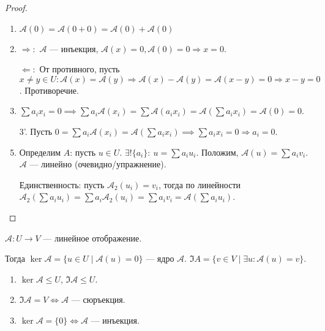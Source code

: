 \begin{proof}
     \begin{enumerate}
         \item $\mathcal{A}(0) = \mathcal{A}(0+0) = \mathcal{A}(0) + \mathcal{A}(0)$ 
         \item $\Rightarrow\!:$  $\mathcal{A}$ --- инъекция,  $\mathcal{A}(x) = 0, \mathcal{A}(0)=0 \Rightarrow x = 0$. 

        $\Leftarrow\!:$ От противного, пусть $x \neq y \in U : \mathcal{A}(x) = \mathcal{A}(y) \Rightarrow \mathcal{A}(x) - \mathcal{A}(y) = \mathcal{A}(x - y) = 0 \Rightarrow x - y = 0$. Противоречие.
        \item  $\sum a_i x_i = 0 \implies \sum a_i \mathcal{A}(x_i) = \sum \mathcal{A}(a_i x_i) = \mathcal{A}(\sum a_i x_i) = \mathcal{A}(0) = 0$.
        \item[3'.] Пусть $0 = \sum a_i \mathcal{A}(x_i) = \mathcal{A}(\sum a_i x_i) \implies \sum a_i x_i = 0 \Rightarrow a_i = 0$.
        \item Определим $A$: пусть  $u \in U$.  $\exists! \{a_i\}\!:\ u = \sum a_i u_i$. Положим,  $\mathcal{A}(u) = \sum a_i v_i$.  $\mathcal{A}$ --- линейно (очевидно/упражнение).

             Единственность: пусть  $\mathcal{A}_2(u_i) = v_i$, тогда  по линейности  $\mathcal{A}_2(\sum a_i u_i) = \sum a_i \mathcal{A}_2(u_i) = \sum a_i v_i = \mathcal{A}(\sum a_i u_i)$.
    \end{enumerate}
\end{proof}
\begin{definition}
    $\mathcal{A}\!: U \to V$ --- линейное отображение.

    Тогда  $\ker \mathcal{A} = \{ u \in U \mid \mathcal{A}(u) = 0\}$ --- ядро  $\mathcal{A}$.  $\Im A = \{ v \in V \mid \exists u: \mathcal{A}(u) = v\}$.
\end{definition}
\begin{properties}
    \begin{enumerate}
        \item $\ker \mathcal{A} \le U$, $\Im \mathcal{A} \le U$.
        \item $\Im \mathcal{A} = V \iff \mathcal{A}$ --- сюръекция.
        \item $\ker \mathcal{A} = \{0\} \iff \mathcal{A}$ --- инъекция.
    \end{enumerate}
\end{properties}
